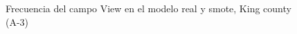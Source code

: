\begin{figure}[H]
    \centering
    
    \caption{Frecuencia del campo View en el modelo real y smote, King county (A-3)}
    \label{frecuency-smote-view}
\end{figure}